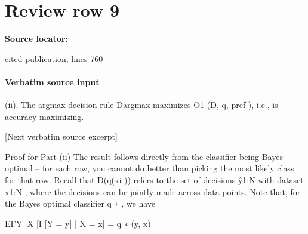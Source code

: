 \documentclass[10pt]{article}
\begin{document}
\section*{Review row 9}
\textbf{Source locator:} {\footnotesize\raggedright cited publication, lines 760\par}
\paragraph{Verbatim source input}
\begin{ReviewVerbatim}
(ii). The argmax decision rule Dargmax maximizes O1 (D, q, pref ), i.e., is accuracy maximizing.

[Next verbatim source excerpt]

Proof for Part (ii)
    The result follows directly from the classifier being Bayes optimal – for each row, you cannot do better
than picking the most likely class for that row.
    Recall that D({q(xi )}) refers to the set of decisions ŷ1:N with dataset x1:N , where the decisions can be
jointly made across data points. Note that, for the Bayes optimal classifier q ∗ , we have

                                            EFY |X [I [Y = y] | X = x] = q ∗ (y, x)


\end{ReviewVerbatim}
\end{document}
